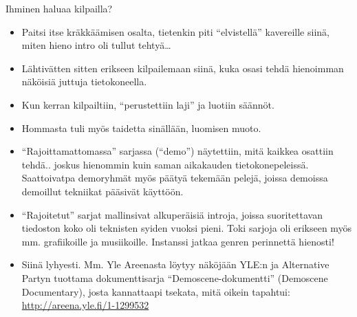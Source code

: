 \documentclass[pdf,10pt]{beamer}
\begin{document}
\begin{frame}{Ihminen haluaa kilpailla?}
  \begin{itemize}
  \item Paitsi itse kräkkäämisen osalta, tietenkin piti
    ``elvistellä'' kavereille siinä, miten hieno intro oli tullut
    tehtyä\ldots
  \item Lähtivätten sitten erikseen kilpailemaan siinä, kuka osasi
    tehdä hienoimman näköisiä juttuja tietokoneella.
  \item Kun kerran kilpailtiin, ``perustettiin laji'' ja luotiin
    säännöt.
  \item Hommasta tuli myös taidetta sinällään, luomisen muoto.
  \item ``Rajoittamattomassa'' sarjassa (``demo'') näytettiin, mitä
    kaikkea osattiin tehdä.. joskus hienommin kuin saman aikakauden
    tietokonepeleissä. Saattoivatpa demoryhmät myös päätyä tekemään
    pelejä, joissa demoissa demoillut tekniikat pääsivät käyttöön.
  \item ``Rajoitetut'' sarjat mallinsivat alkuperäisiä introja, joissa
    suoritettavan tiedoston koko oli teknisten syiden vuoksi
    pieni. Toki sarjoja oli erikseen myös mm. grafiikoille ja
    musiikoille. Instanssi jatkaa genren perinnettä hienosti!
  \item Siinä lyhyesti. Mm. Yle Areenasta löytyy näköjään YLE:n ja
    Alternative Partyn tuottama dokumenttisarja
    ``Demoscene-dokumentti'' (Demoscene Documentary), josta
    kannattaapi tsekata, mitä oikein tapahtui:
    \url{http://areena.yle.fi/1-1299532}
  \end{itemize}
\end{frame}
\end{document}
